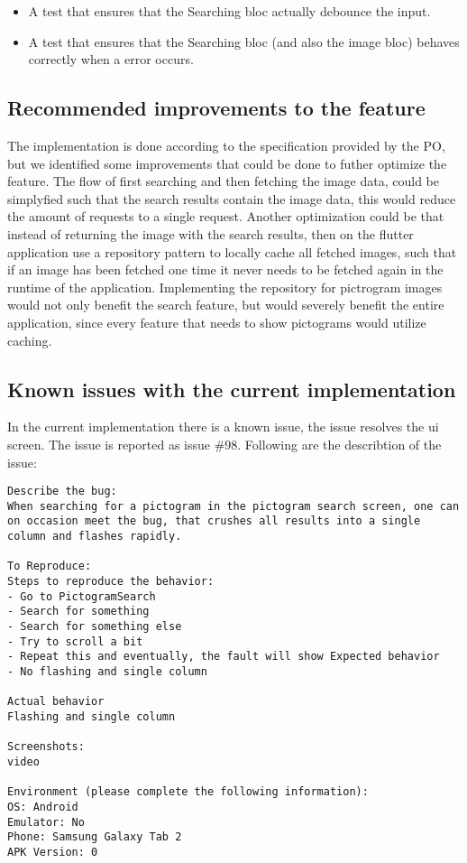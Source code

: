 \begin{itemize}
  \item A test that ensures that the Searching \gls{bloc} actually debounce the input.
  \item A test that ensures that the Searching \gls{bloc} (and also the image \gls{bloc}) behaves correctly when a error occurs.
\end{itemize}

\subsection{Recommended improvements to the feature}
The implementation is done according to the specification provided by the \gls{PO}, but we identified some improvements that could be done to futher optimize the feature. The flow of first searching and then fetching the image data, could be simplyfied such that the search results contain the image data, this would reduce the amount of requests to a single request. Another optimization could be that instead of returning the image with the search results, then on the flutter application use a repository pattern to locally cache all fetched images, such that if an image has been fetched one time it never needs to be fetched again in the runtime of the application. Implementing the repository for pictrogram images would not only benefit the search feature, but would severely benefit the entire application, since every feature that needs to show pictograms would utilize caching.

\subsection{Known issues with the current implementation}
In the current implementation there is a known issue, the issue resolves the \gls{ui} screen. The issue is reported as issue \#98. Following are the describtion of the issue:
\begin{lstlisting}
Describe the bug:
When searching for a pictogram in the pictogram search screen, one can on occasion meet the bug, that crushes all results into a single column and flashes rapidly.

To Reproduce:
Steps to reproduce the behavior:
- Go to PictogramSearch
- Search for something
- Search for something else
- Try to scroll a bit
- Repeat this and eventually, the fault will show Expected behavior
- No flashing and single column

Actual behavior
Flashing and single column

Screenshots:
video

Environment (please complete the following information):
OS: Android
Emulator: No
Phone: Samsung Galaxy Tab 2
APK Version: 0
\end{lstlisting}
